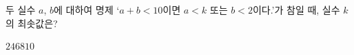 두 실수 $a$, $b$에 대하여 명제 `$a+b<10$이면 $a<k$ 또는 $b<2$이다.'가 참일 때, 실수 $k$의 최솟값은?
\begin{choices32}{$2$}{$4$}{$6$}{$8$}{$10$}\end{choices32}
